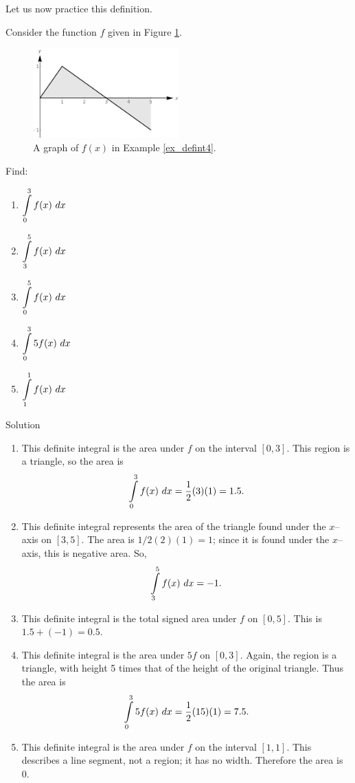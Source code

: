 Let us now practice this definition. 

\begin{example}\label{ex_defint4}
Consider the function $f$ given in Figure \ref{fig_int_2}.

\begin{figure}[H]
	\begin{center}
			\includegraphics[width=0.5\textwidth]{fig_int_2}
	\caption{A graph of $f(x)$ in Example \ref{ex_defint4}.}
	\label{fig_int_2}
	\end{center}
\end{figure}

\ifanalysis\pagebreak\fi
 Find:

\begin{multicols}{3}
\begin{enumerate}
		\item		$\ds \int\limits_0^3 f(x)\ dx$
		\item		$\ds \int\limits_3^5 f(x)\ dx$
		\item		$\ds \int\limits_0^5 f(x)\ dx$
		\item		$\ds \int\limits_0^3 5f(x)\ dx$
		\item		$\ds \int\limits_1^1 f(x) \ dx$
\end{enumerate}
\end{multicols}


Solution 

\begin{enumerate}
		\item	This definite integral is the area under $f$ on the interval $[0,3]$. This region is a triangle, so the area is 
		$$\displaystyle \int\limits_0^3 f(x)\ dx=\frac12(3)(1) = 1.5.$$ 
		\item		This definite integral  represents the area of the triangle found under the $x$--axis on $[3,5]$. The area is $1/2(2)(1) = 1$; since it is found under the $x$--axis, this is negative area. So, 
		$$ \displaystyle \int\limits_3^5 f(x)\ dx = -1.$$
		\item		This definite integral  is the total signed area under $f$ on $[0,5]$. This is $1.5 + (-1) = 0.5$.
		\item		This definite integral is the area under $5f$ on $[0,3]$. Again, the region is a triangle, with height 5 times that of the height of the original triangle. Thus the area is $$\displaystyle \int\limits_0^35f(x)\ dx = \frac12(15)(1) = 7.5.$$
		
		\item		This definite integral  is the area under $f$ on the interval $[1,1]$. This describes a line segment, not a region; it has no width. Therefore the area is 0.
\end{enumerate}
\end{example}

